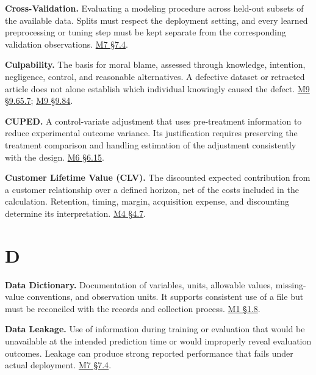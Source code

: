 \noindent\textbf{Cross-Validation.} Evaluating a modeling procedure across
held-out subsets of the available data. Splits must respect the
deployment setting, and every learned preprocessing or tuning step must
be kept separate from the corresponding validation observations.
\href{Marketing_Analytics_Lecture_Notes.pdf\#M07-validation-cross-validation-and-leakage}{M7
§7.4}.

\noindent\textbf{Culpability.} The basis for moral blame, assessed through
knowledge, intention, negligence, control, and reasonable alternatives.
A defective dataset or retracted article does not alone establish which
individual knowingly caused the defect.
\hyperref[M09-responsibility-for-the-artifact-and-its-uses]{M9
§9.65.7};
\hyperref[M09-misleading-research-replication-and-correction]{M9
§9.84}.

\noindent\textbf{CUPED.} A control-variate adjustment that uses pre-treatment
information to reduce experimental outcome variance. Its justification
requires preserving the treatment comparison and handling estimation of
the adjustment consistently with the design.
\href{Marketing_Analytics_Lecture_Notes.pdf\#M06-mhealth-prior-activity-and-experiment-precision}{M6
§6.15}.

\noindent\textbf{Customer Lifetime Value (CLV).} The discounted expected
contribution from a customer relationship over a defined horizon, net of
the costs included in the calculation. Retention, timing, margin,
acquisition expense, and discounting determine its interpretation.
\href{Marketing_Analytics_Lecture_Notes.pdf\#M04-customer-lifetime-value-depends-on-timing-and-margin}{M4
§4.7}.

\par{}
\hypertarget{module-d}{%
\section*{D}\label{module-d}}

\noindent\textbf{Data Dictionary.} Documentation of variables, units, allowable
values, missing-value conventions, and observation units. It supports
consistent use of a file but must be reconciled with the records and
collection process.
\href{Marketing_Analytics_Lecture_Notes.pdf\#M01-mhealth-from-food-entries-to-a-decision-table}{M1
§1.8}.

\noindent\textbf{Data Leakage.} Use of information during training or evaluation
that would be unavailable at the intended prediction time or would
improperly reveal evaluation outcomes. Leakage can produce strong
reported performance that fails under actual deployment.
\href{Marketing_Analytics_Lecture_Notes.pdf\#M07-validation-cross-validation-and-leakage}{M7
§7.4}.

